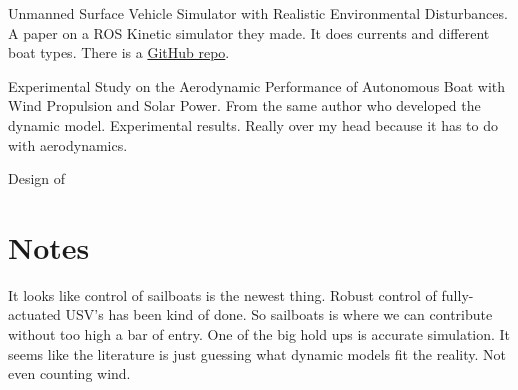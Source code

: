 \documentclass[conference]{IEEEtran}
\begin{document}
\cite{Paravisi2019} Unmanned Surface Vehicle Simulator with Realistic Environmental Disturbances. A paper on a ROS Kinetic simulator they made. It does currents and different boat types. There is a \href{https://github.com/disaster-robotics-proalertas/usv_sim_lsa}{GitHub repo}.

\cite{Setiawan2020} Experimental Study on the Aerodynamic Performance of Autonomous Boat with Wind Propulsion and Solar Power. From the same author who developed the dynamic model. Experimental results. Really over my head because it has to do with aerodynamics.


\cite{Sauzé2006} Design of 

\section{Notes}
It looks like control of sailboats is the newest thing. Robust control of fully-actuated USV's has been kind of done. So sailboats is where we can contribute without too high a bar of entry. One of the big hold ups is accurate simulation. It seems like the literature is just guessing what dynamic models fit the reality. Not even counting wind.


\end{document}

